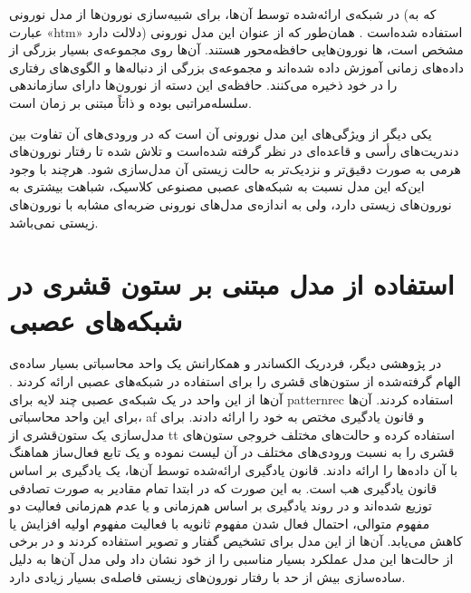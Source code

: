 \documentclass[12pt]{report}
\begin{document}
در شبکه‌ی ارائه‌شده توسط آن‌ها، برای شبیه‌سازی نورون‌ها از مدل نورونی   (که به عبارت «\gls{htm}» دلالت دارد) استفاده شده‌است \cite{HTM2011}. همان‌طور که از عنوان این مدل نورونی مشخص است، ‌ها نورون‌هایی حافظه‌محور هستند. آن‌ها روی مجموعه‌ی بسیار بزرگی از داده‌های زمانی آموزش داده شده‌اند و مجموعه‌ی بزرگی از دنباله‌ها و الگوی‌های رفتاری را در خود ذخیره می‌کنند. حافظه‌ی این دسته از نورون‌ها دارای سازماندهی سلسله‌مراتبی بوده و ذاتاً مبتنی بر زمان است.

یکی دیگر از ویژگی‌های این مدل نورونی آن است که در ورودی‌های آن تفاوت بین دندریت‌های رأسی و قاعده‌ای در نظر گرفته‌‌ شده‌است و تلاش شده تا رفتار نورون‌های هرمی به صورت دقیق‌تر و نزدیک‌تر به حالت زیستی آن مدل‌سازی شود. هرچند با وجود این‌که این مدل نسبت به شبکه‌های عصبی مصنوعی کلاسیک، شباهت بیشتری به نورون‌های زیستی دارد، ولی به اندازه‌ی مدل‌های نورونی ضربه‌ای مشابه با نورون‌های زیستی نمی‌باشد.

\section{استفاده‌ از مدل مبتنی بر ستون قشری در شبکه‌های عصبی}
در پژوهشی دیگر، فردریک الکساندر و همکارانش یک واحد محاسباتی  بسیار ساده‌ی الهام گرفته‌شده از ستون‌های قشری را برای استفاده در شبکه‌های عصبی ارائه کردند \cite{Alexandre1991}. آن‌ها از این واحد در یک شبکه‌ی عصبی چند لایه برای \gls{patternrec} استفاده کردند.
آن‌ها برای این واحد محاسباتی، \gls{af} و قانون یادگیری مختص به خود را ارائه دادند. برای مدل‌سازی یک ستون‌قشری از \gls{tt} استفاده کرده و حالت‌های مختلف خروجی ستون‌های قشری را به نسبت ورودی‌های مختلف در آن لیست نموده و  یک تابع فعال‌ساز هماهنگ با آن داده‌ها را ارائه دادند. 
	قانون یادگیری‌ ارائه‌شده توسط آن‌ها، یک یادگیری بر اساس قانون یادگیری هب است. به این صورت که در ابتدا تمام مقادیر به صورت تصادفی توزیع شده‌اند و در روند یادگیری بر اساس هم‌زمانی و یا عدم هم‌زمانی فعالیت دو مفهوم متوالی، احتمال فعال شدن مفهوم ثانویه با فعالیت مفهوم اولیه افزایش یا کاهش می‌یابد.
آن‌ها از این مدل برای تشخیص گفتار و تصویر استفاده کردند و در برخی از حالت‌ها این مدل عملکرد بسیار مناسبی را از خود نشان داد ولی مدل آن‌ها به دلیل ساده‌سازی بیش از حد با رفتار نورون‌های زیستی فاصله‌ی بسیار زیادی دارد.
\end{document}
